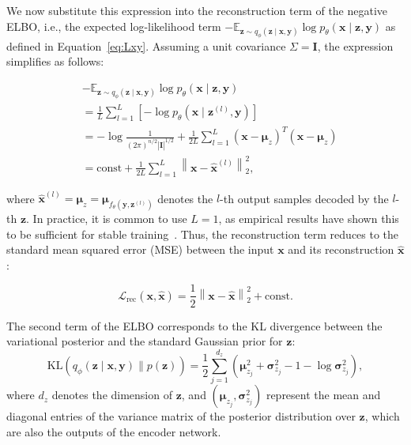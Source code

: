 \documentclass{article}
\begin{document}
{We now substitute this expression into the reconstruction term of the negative ELBO, i.e., the expected log-likelihood term $- \mathbb{E}_{\mathbf{z} \sim q_\phi(\mathbf{z} \mid \mathbf{x}, \mathbf{y})} \log p_\theta(\mathbf{x} \mid \mathbf{z}, \mathbf{y})$ as defined in Equation~\eqref{eq:Lxy}. Assuming a unit covariance $\Sigma = \mathbf{I}$, the expression simplifies as follows: 


\begin{equation}\label{eq:logpxz}
\begin{aligned}
    &- \mathbb{E}_{\mathbf{z} \sim q_\phi(\mathbf{z} \mid \mathbf{x}, \mathbf{y})} \log p_\theta(\mathbf{x} \mid \mathbf{z}, \mathbf{y}) \\
    &= \frac{1}{L} \sum_{l=1}^{L} \left[ -\log p_\theta(\mathbf{x} \mid \mathbf{z}^{(l)}, \mathbf{y}) \right] \\
    &= -\log \frac{1}{(2\pi)^{n/2}|\mathbf{I}|^{1/2}} 
    + \frac{1}{2L} \sum_{l=1}^{L} (\mathbf{x} - \boldsymbol{\mu}_{z})^T (\mathbf{x} - \boldsymbol{\mu}_{z}) \\
    &= \text{const} + \frac{1}{2L} \sum_{l=1}^{L} \left\| \mathbf{x} - \hat{\mathbf{x}}^{(l)} \right\|_2^2,
\end{aligned}
\end{equation}

where $\hat{\mathbf{x}}^{(l)} = \boldsymbol{\mu}_{z} = \boldsymbol{\mu}_{f_\theta(\mathbf{y}, \mathbf{z}^{(l)})}$ denotes the $l$-th output samples decoded by the $l$-th $\mathbf{z}$. In practice, it is common to use $L = 1$, as empirical results have shown this to be sufficient for stable training~\cite{kingma2013auto}. Thus, the reconstruction term reduces to the standard mean squared error (MSE) between the input $\mathbf{x}$ and its reconstruction $\hat{\mathbf{x}}$:

\begin{equation}
    \mathcal{L}_{\text{rec}}(\mathbf{x}, \hat{\mathbf{x}}) = \frac{1}{2} \left\| \mathbf{x} - \hat{\mathbf{x}} \right\|_2^2 + \text{const}.
\end{equation}


The second term of the ELBO corresponds to the KL divergence between the variational posterior and the standard Gaussian prior for $\mathbf{z}$:
\begin{equation}
\mathrm{KL} \left( q_\phi(\mathbf{z} \mid \mathbf{x}, \mathbf{y}) \parallel p(\mathbf{z}) \right) = \frac{1}{2} \sum_{j=1}^{d_z} \left( \mathbf{\mu}_{z_j}^2 + \mathbf{\sigma}_{z_j}^2 - 1 - \log \mathbf{\sigma}_{z_j}^2 \right),
\end{equation}
where \(d_z\) denotes the dimension of \(\mathbf{z}\), and \((\mathbf{\mu}_{z_j}, \mathbf{\sigma}_{z_j}^2)\) represent the mean and diagonal entries of the variance matrix of the posterior distribution over \(\mathbf{z}\), which are also the outputs of the encoder network.


}
\end{document}
